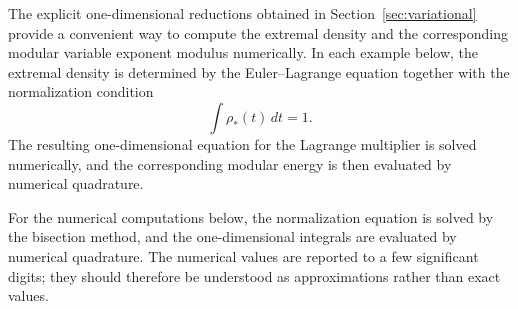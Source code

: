 \documentclass[12pt]{amsart}
\numberwithin{equation}{section}
\theoremstyle{plain}
\theoremstyle{definition}
\begin{document}
The explicit one-dimensional reductions obtained in Section~\ref{sec:variational} provide a convenient way to compute the extremal density and the corresponding modular variable exponent modulus numerically. In each example below, the extremal density is determined by the Euler--Lagrange equation together with the normalization condition
\begin{equation*}
\int \rho_*(t)\,dt=1.
\end{equation*}
The resulting one-dimensional equation for the Lagrange multiplier is solved numerically, and the corresponding modular energy is then evaluated by numerical quadrature.

For the numerical computations below, the normalization equation is solved by the bisection method, and the one-dimensional integrals are evaluated by numerical quadrature. The numerical values are reported to a few significant digits; they should therefore be understood as approximations rather than exact values.
\end{document}
